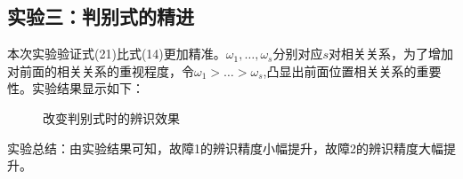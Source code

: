 \documentclass[lang=cn,11pt,a4paper]{elegantpaper}
\begin{document}
\subsection{实验三：判别式的精进}
本次实验验证式(21)比式(14)更加精准。$\omega_1,\ldots,\omega_s$分别对应$s$对相关关系，为了增加对前面的相关关系的重视程度，令$\omega_1>\ldots>\omega_s$,凸显出前面位置相关关系的重要性。实验结果显示如下：
\begin{figure}[H]
	\centering  %
	\caption{改变判别式时的辨识效果}
	\label{Fig.main}
\end{figure}
实验总结：由实验结果可知，故障1的辨识精度小幅提升，故障2的辨识精度大幅提升。
\end{document}
